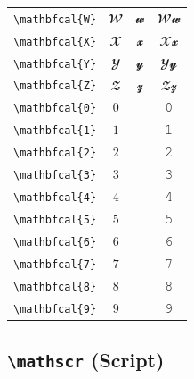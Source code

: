 \documentclass[12pt,a4paper]{article}
\begin{document}
\begin{longtable}{|c|c|c|c|}
\verb|\mathbfcal{W}| & $\mathbfcal{W}$ & $\mathbfcal{w}$ & $ 𝓦 𝔀 $ \\
\verb|\mathbfcal{X}| & $\mathbfcal{X}$ & $\mathbfcal{x}$ & $ 𝓧 𝔁 $ \\
\verb|\mathbfcal{Y}| & $\mathbfcal{Y}$ & $\mathbfcal{y}$ & $ 𝓨 𝔂 $ \\
\verb|\mathbfcal{Z}| & $\mathbfcal{Z}$ & $\mathbfcal{z}$ & $ 𝓩 𝔃 $ \\
\verb|\mathbfcal{0}| & $\mathbfcal{0}$ & & 𝟶 \\
\verb|\mathbfcal{1}| & $\mathbfcal{1}$ & & 𝟷 \\
\verb|\mathbfcal{2}| & $\mathbfcal{2}$ & & 𝟸 \\
\verb|\mathbfcal{3}| & $\mathbfcal{3}$ & & 𝟹 \\
\verb|\mathbfcal{4}| & $\mathbfcal{4}$ & & 𝟺 \\
\verb|\mathbfcal{5}| & $\mathbfcal{5}$ & & 𝟻 \\
\verb|\mathbfcal{6}| & $\mathbfcal{6}$ & & 𝟼 \\
\verb|\mathbfcal{7}| & $\mathbfcal{7}$ & & 𝟽 \\
\verb|\mathbfcal{8}| & $\mathbfcal{8}$ & & 𝟾 \\
\verb|\mathbfcal{9}| & $\mathbfcal{9}$ & & 𝟿 \\
\hline
\end{longtable}

\newpage

\subsection*{\texttt{\textbackslash{}mathscr} (Script)}
\end{document}
